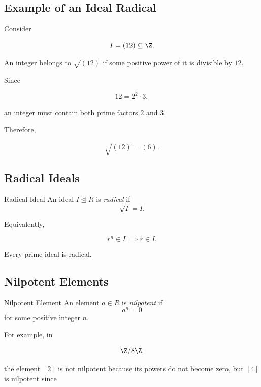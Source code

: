 \subsection{Example of an Ideal Radical}
\label{subsec:ideal-radical-example}

Consider

\[ I=(12)\subseteq\Z. \]

An integer belongs to \(\sqrt{(12)}\) if some positive power of it is
divisible by \(12\).

Since

\[ 12=2^2\cdot3, \]

an integer must contain both prime factors \(2\) and \(3\).

Therefore,

\[ \sqrt{(12)}=(6). \]

\subsection{Radical Ideals}
\label{subsec:radical-ideals}

\begin{definitionbox}{Radical Ideal}
An ideal \(I\trianglelefteq R\) is \emph{radical} if
\[ \sqrt{I}=I. \]
\end{definitionbox}

Equivalently,

\[ r^n\in I\implies r\in I. \]

Every prime ideal is radical.

\subsection{Nilpotent Elements}
\label{subsec:nilpotent-elements}

\begin{definitionbox}{Nilpotent Element}
An element \(a\in R\) is \emph{nilpotent} if
\[ a^n=0 \]
for some positive integer \(n\).
\end{definitionbox}

For example, in

\[ \Z/8\Z, \]

the element \([2]\) is not nilpotent because its powers do not become zero,
but \([4]\) is nilpotent since

